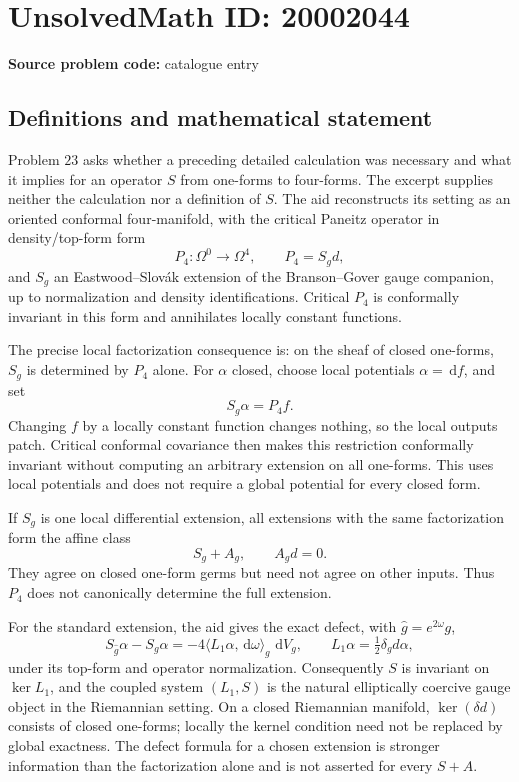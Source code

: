 \documentclass[11pt]{article}
\newcommand{\dd}{\,\mathrm{d}}
\begin{document}
\section*{UnsolvedMath ID: 20002044}
\textbf{Source problem code:} catalogue entry
\subsection{Definitions and mathematical statement}
Problem \(23\) asks whether a preceding detailed calculation was necessary and what it implies for an operator \(S\) from one-forms to four-forms. The excerpt supplies neither the calculation nor a definition of \(S\). The aid reconstructs its setting as an oriented conformal four-manifold, with the critical Paneitz operator in density/top-form form
\[
 P_4:\Omega^0\to\Omega^4,\qquad P_4=S_gd,
\]
and \(S_g\) an Eastwood--Slov\'ak extension of the Branson--Gover gauge companion, up to normalization and density identifications. Critical \(P_4\) is conformally invariant in this form and annihilates locally constant functions.

The precise local factorization consequence is: on the sheaf of closed one-forms, \(S_g\) is determined by \(P_4\) alone. For \(\alpha\) closed, choose local potentials \(\alpha=\dd f\), and set
\[
 S_g\alpha=P_4f.
\]
Changing \(f\) by a locally constant function changes nothing, so the local outputs patch. Critical conformal covariance then makes this restriction conformally invariant without computing an arbitrary extension on all one-forms. This uses local potentials and does not require a global potential for every closed form.

If \(S_g\) is one local differential extension, all extensions with the same factorization form the affine class
\[
 S_g+A_g,\qquad A_gd=0.
\]
They agree on closed one-form germs but need not agree on other inputs. Thus \(P_4\) does not canonically determine the full extension.

For the standard extension, the aid gives the exact defect, with \(\widehat g=e^{2\omega}g\),
\[
 S_{\widehat g}\alpha-S_g\alpha
 =-4\langle L_1\alpha,\dd\omega\rangle_g\,\dd V_g,
 \qquad L_1\alpha=\tfrac12\delta_gd\alpha,
\]
under its top-form and operator normalization. Consequently \(S\) is invariant on \(\ker L_1\), and the coupled system \((L_1,S)\) is the natural elliptically coercive gauge object in the Riemannian setting. On a closed Riemannian manifold, \(\ker(\delta d)\) consists of closed one-forms; locally the kernel condition need not be replaced by global exactness. The defect formula for a chosen extension is stronger information than the factorization alone and is not asserted for every \(S+A\).
\end{document}
